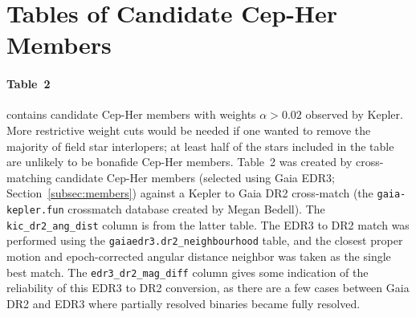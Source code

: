 \documentclass[12pt,twocolumn]{aastex63}
\begin{document}
% 
% 
% 
% 

                            
 

\appendix
\section{Tables of Candidate Cep-Her Members}
\label{app:members}

\paragraph{Table~2} contains candidate Cep-Her members with weights
$\alpha>0.02$ observed by Kepler.  More restrictive weight cuts would
be needed if one wanted to remove the majority of field star
interlopers; at least half of the stars included in the table are
unlikely to be bonafide Cep-Her members.  Table~2  was created by
cross-matching candidate Cep-Her members (selected using Gaia EDR3;
Section~\ref{subsec:members}) against a Kepler to Gaia DR2 cross-match
(the \texttt{gaia-kepler.fun} crossmatch database created by Megan
Bedell).  The \texttt{kic\_dr2\_ang\_dist} column is from the latter
table.  The EDR3 to DR2 match was performed using the
\texttt{gaiaedr3.dr2\_neighbourhood} table, and the closest proper
motion and epoch-corrected angular distance neighbor was taken as the
single best match.  The \texttt{edr3\_dr2\_mag\_diff} column gives
some indication of the reliability of this EDR3 to DR2 conversion, as
there are a few cases between Gaia DR2 and EDR3 where partially
resolved binaries became fully resolved.
\end{document}
